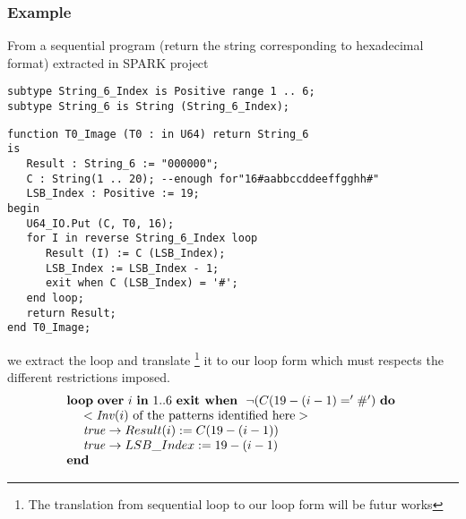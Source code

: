 \documentclass[a4paper,10pt]{article}
\newcommand{\idx}{\ensuremath{i}\xspace}
\newcommand{\KWloop}{\ensuremath{\mathrm{\textbf{loop}}~}}
\newcommand{\KWdo}{\ensuremath{\mathrm{\textbf{do}}~}}
\newcommand{\KWend}{\ensuremath{\mathrm{\textbf{end}}}}
\newcommand{\KWover}{\ensuremath{\mathrm{\textbf{over}}~}}
\newcommand{\KWin}{\ensuremath{~\mathrm{\textbf{in}}~}}
\newcommand{\KWexit}{\ensuremath{\mathrm{\textbf{exit when}}~}}
\newcommand{\Inv}[1]{\ensuremath{\mathit{Inv}(#1)\xspace}}
\begin{document}
\subsubsection*{Example}
From a sequential program (return the string corresponding to hexadecimal format) 
extracted in SPARK project ~\cite{sparkskein:url} 
\begin{lstlisting}
subtype String_6_Index is Positive range 1 .. 6;
subtype String_6 is String (String_6_Index);
\end{lstlisting}

\begin{lstlisting}
function T0_Image (T0 : in U64) return String_6
is
   Result : String_6 := "000000";
   C : String(1 .. 20); --enough for"16#aabbccddeeffgghh#"
   LSB_Index : Positive := 19;
begin
   U64_IO.Put (C, T0, 16);
   for I in reverse String_6_Index loop
      Result (I) := C (LSB_Index);
      LSB_Index := LSB_Index - 1;
      exit when C (LSB_Index) = '#';
   end loop;
   return Result;
end T0_Image;
\end{lstlisting}

we extract the loop and translate \footnote{The translation from sequential loop to our 
loop form will be futur works} it to our loop form which must respects the different 
restrictions imposed.
$$\begin{array}{l}
  \KWloop \KWover \idx \KWin 1 .. 6 ~ \KWexit ~ \neg (C (19-(\idx-1) = '\#') ~ \KWdo \\
  ~~~~ < \textrm{\Inv{\idx} of the patterns identified here} >\\
  ~~~~ \mathit{true} \rightarrow Result (\idx) := C (19-(\idx-1))\\
  ~~~~ \mathit{true} \rightarrow LSB\_Index := 19 - (\idx-1)\\
  \KWend
\end{array}$$
\fi



\end{document}
